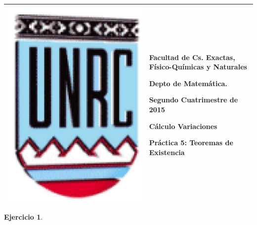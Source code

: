 \documentclass{article}
\newcounter{ejer}
\newtheorem{ejercicio}[ejer]{Ejercicio}}
\begin{document}
\setlength{\unitlength}{1cm}
%
\setlength{\extrarowheight}{5mm}
%

\setlength{\extrarowheight}{-5mm}
\noindent\begin{tabular}{m{} m{}}\hline\hline
\medskip

\includegraphics[scale=0.3]{imagenes/unrc.jpg} &
\begin{bfseries}  \begin{scshape}
Facultad de Cs. Exactas, Físico-Químicas y Naturales\par
        Depto de Matem\'atica.\par
        Segundo Cuatrimestre de 2015\par
        Cálculo Variaciones \par

        Práctica 5: Teoremas de Existencia
				\end{scshape}
\end{bfseries}
\\
\hline\hline
\end{tabular}
\renewcommand{\theenumi}{\alph{enumi}}


\begin{ejercicio} 
\end{ejercicio}
\end{document}
